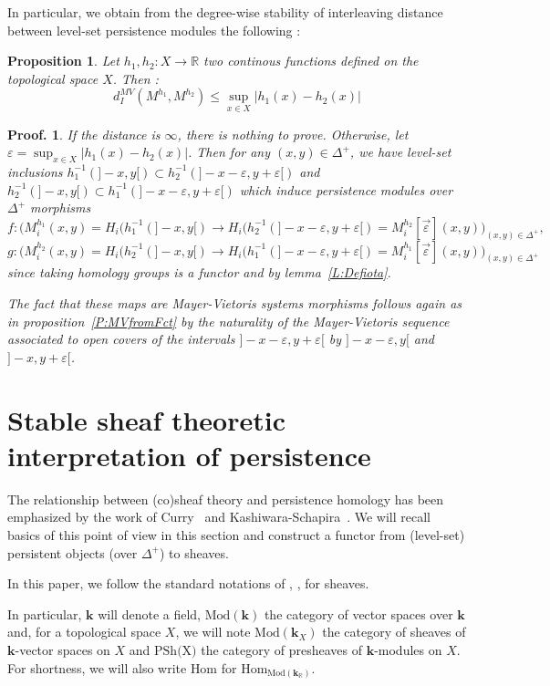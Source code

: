 \documentclass[a4paper, english, 11pt]{article}
\newcommand{\kk}[0]{\textbf{k}}
\newcommand{\Mod}[0]{\text{Mod}}
\newcommand{\0}{\vec{0}}
\newcommand{\R}[0]{\mathbb{R}}
\newcommand{\Hom}[0]{\text{Hom}}
\newtheorem{prop}{Proposition}[section]
\newtheorem*{pf}{Proof.} }
\begin{document}
In particular, we obtain from the degree-wise stability of interleaving distance between level-set persistence modules the following : 

\begin{prop}\label{P:StabilityfordMV}
Let $h_1,h_2 : X \to \R$ two continous functions defined on the topological space $X$. Then : $$d_I^{MV}(M^{h_1},M^{h_2})\leq \sup_{x\in X} |h_1(x)-h_2(x)| $$

\end{prop}
\begin{pf} If the distance is $\infty$, there is nothing to prove. Otherwise, let $\varepsilon= \sup_{x\in X} |h_1(x)-h_2(x)|$. Then for any $(x,y)\in \Delta^{+}$, we have  level-set inclusions  $h^{-1}_1(]-x,y[) \subset h^{-1}_2(]-x-\varepsilon, y+\varepsilon[)$ and  $h^{-1}_2(]-x,y[) \subset h^{-1}_1(]-x-\varepsilon, y+\varepsilon[)$ which induce persistence modules over $\Delta^+$ morphisms 
$$f:\big(M_i^{h_1}(x,y)=H_i(h_1^{-1}(]-x,y[) \to H_i(h_2^{-1}(]-x-\varepsilon,y+\varepsilon[)= M_i^{h_2}[\vec{\varepsilon}](x,y)\big)_{(x,y)\in \Delta^+},  $$ 
$$g:\big(M_i^{h_2}(x,y)=H_i(h_2^{-1}(]-x,y[) \to H_i(h_1^{-1}(]-x-\varepsilon,y+\varepsilon[)= M_i^{h_1}[\vec{\varepsilon}](x,y)\big)_{(x,y)\in \Delta^+} $$ since 
taking homology groups is a functor and by lemma~\ref{L:Defiota}. 

The fact that these maps are Mayer-Vietoris systems morphisms follows again as in proposition~\ref{P:MVfromFct} by the naturality of the Mayer-Vietoris sequence associated to open covers of the intervals $]-x-\varepsilon, y+\varepsilon[$ by $]-x-\varepsilon, y[$ and $]-x, y+\varepsilon[$.
\end{pf}


\section{Stable sheaf theoretic interpretation of persistence}
The relationship between (co)sheaf theory and persistence homology has been emphasized by the work of Curry~\cite{Curr14} and Kashiwara-Schapira~\cite{KS18, Kash18}. We will recall basics of this point of view in this section and construct a functor from (level-set) persistent objects (over $\Delta^+$) to sheaves. 


\smallskip

In this paper, we follow the standard notations of \cite{Kash90}, \cite{KS18}, \cite{Berk18} for sheaves. 

In particular,  $\kk$ will denote a field, $\Mod(\kk)$ the category of vector spaces over $\kk$ and, for   a topological space $X$,  we will note $\Mod(\kk_X)$ the category of sheaves of $\kk$-vector spaces on $X$ and $\text{PSh(X)}$ the category of presheaves of $\kk$-modules on $X$. For shortness, we will also write $\Hom$ for $\Hom_{\Mod(\kk_\R)}$. 
\end{document}
